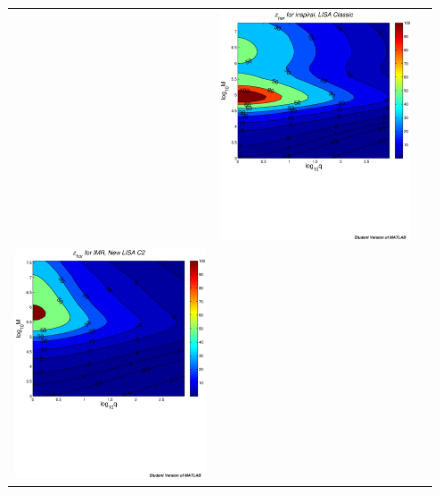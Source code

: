 \documentclass{iopart}
\begin{document}
\begin{figure}[htb]
\begin{center}
\begin{tabular}{ccc}
&\includegraphics[scale=0.33,clip=true]{FigEmanuele/InspZhorContour.ps}\\
\includegraphics[scale=0.33,clip=true]{FigEmanuele/C2IMRZhorContour.ps}

\end{tabular}
\end{center}
\end{figure}
\end{document}
